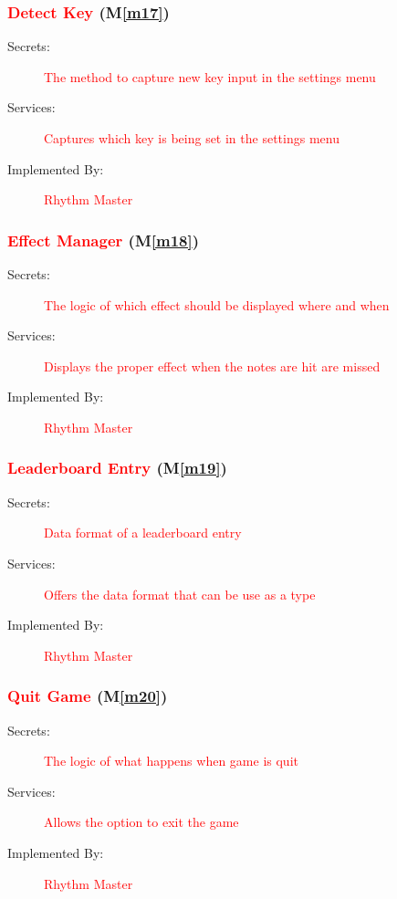 \documentclass[12pt, titlepage]{article}
\newcommand{\mref}[1]{M\ref{#1}}
\begin{document}
\subsubsection{\textcolor{red}{Detect Key} (\mref{m17})}

\begin{description}
\item[Secrets:] \textcolor{red}{The method to capture new key input in the settings menu}
\item[Services:] \textcolor{red}{Captures which key is being set in the settings menu}
\item[Implemented By:] \textcolor{red}{Rhythm Master}
\end{description}

\subsubsection{\textcolor{red}{Effect Manager} (\mref{m18})}

\begin{description}
\item[Secrets:] \textcolor{red}{The logic of which effect should be displayed where and when}
\item[Services:] \textcolor{red}{Displays the proper effect when the notes are hit are missed}
\item[Implemented By:] \textcolor{red}{Rhythm Master}
\end{description}

\subsubsection{\textcolor{red}{Leaderboard Entry} (\mref{m19})}

\begin{description}
\item[Secrets:] \textcolor{red}{Data format of a leaderboard entry}
\item[Services:] \textcolor{red}{Offers the data format that can be use as a type}
\item[Implemented By:] \textcolor{red}{Rhythm Master}
\end{description}

\subsubsection{\textcolor{red}{Quit Game} (\mref{m20})}

\begin{description}
\item[Secrets:] \textcolor{red}{The logic of what happens when game is quit}
\item[Services:] \textcolor{red}{Allows the option to exit the game}
\item[Implemented By:] \textcolor{red}{Rhythm Master}
\end{description}
\end{document}
